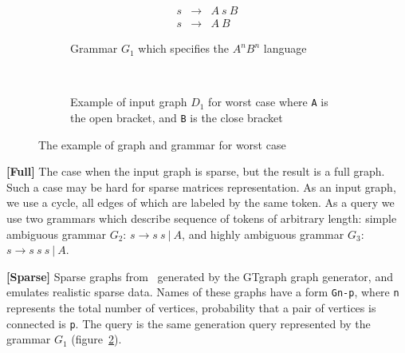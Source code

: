 \begin{figure}[h]
    \centering
    \begin{subfigure}[b]{0.24\textwidth}
        \centering
        \[
         \begin{array}{rcl}
           s & \rightarrow & A \ s \ B \\
           s & \rightarrow & A \ B
         \end{array}
         \]
        \caption{Grammar $G_1$ which specifies the $A^n B^n$ language}
    \end{subfigure}%
    ~
    \begin{subfigure}[b]{0.24\textwidth}
        \centering

        \caption{Example of input graph $D_1$ for worst case where \texttt{A} is the open bracket, and \texttt{B} is the close bracket}
        \label{fig:worstCaseGraph}
    \end{subfigure}%
    \caption{The example of graph and grammar for worst case}
    \label{fig:grammar_example}
\end{figure}


\textbf{[Full]} The case when the input graph is sparse, but the result is a full graph.
Such a case may be hard for sparse matrices representation.
As an input graph, we use a cycle, all edges of which are labeled by the same token.
As a query we use two grammars which describe sequence of tokens of arbitrary length: simple ambiguous grammar $G_2$: $s \rightarrow  s \ s \ | \ A$,  and highly ambiguous grammar $G_3$: $s \rightarrow s \ s \ s \ | \ A$.

\textbf{[Sparse]} Sparse graphs from~\cite{fan2018scaling} generated by the GTgraph graph generator, and emulates realistic sparse data.
Names of these graphs have a form \texttt{Gn-p}, where \texttt{n} represents the total number of vertices, probability that a pair of vertices is connected is \texttt{p}.
The query is the same generation query represented by the grammar $G_1$ (figure~\ref{fig:grammar_example}).
